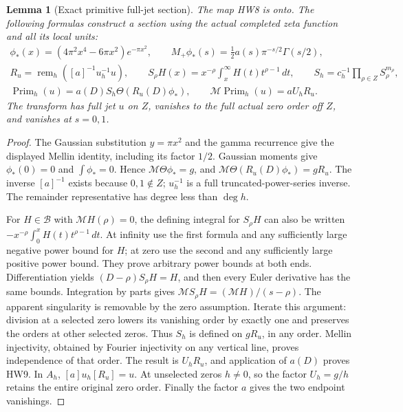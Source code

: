 \documentclass[11pt]{article}
\newtheorem{lemma}[theorem]{Lemma}
\newcommand{\B}{\mathscr B}
\newcommand{\M}{\mathcal M}
\newcommand{\rem}{\operatorname{rem}}
\begin{document}
\begin{lemma}[Exact primitive full-jet section]\label{hw:sectionlemma}
The map HW8 is onto. The following formulas construct a section
using the actual completed zeta function and all its local units:
\[
 \begin{gathered}
 \phi_*(x)=(4\pi^2x^4-6\pi x^2)e^{-\pi x^2},\qquad
 M_+\phi_*(s)=\tfrac12a(s)\pi^{-s/2}\Gamma(s/2),\\
 R_u=\rem_h([a]^{-1}u_h^{-1}u),\qquad
 S_\rho H(x)=x^{-\rho}\int_x^\infty H(t)t^{\rho-1}\,dt,\qquad
 S_h=c_h^{-1}\prod_{\rho\in Z}S_\rho^{m_\rho},\\
 \operatorname{Prim}_h(u)
       =a(D)S_h\Theta(R_u(D)\phi_*),\qquad
 \M\operatorname{Prim}_h(u)=aU_hR_u.
 \end{gathered}
 \tag{HW9}\label{hw:primitive}
\]
The transform has full jet \(u\) on \(Z\), vanishes to the full
actual zero order off \(Z\), and vanishes at \(s=0,1\).
\end{lemma}
\begin{proof}
The Gaussian substitution \(y=\pi x^2\) and the gamma recurrence
give the displayed Mellin identity, including its factor \(1/2\).
Gaussian moments give \(\phi_*(0)=0\) and \(\int\phi_*=0\).
Hence \(\M\Theta\phi_*=g\), and
\(\M\Theta(R_u(D)\phi_*)=gR_u\).
The inverse \([a]^{-1}\) exists because \(0,1\notin Z\);
\(u_h^{-1}\) is a full truncated-power-series inverse.
The remainder representative has degree less than \(\deg h\).

For \(H\in\B\) with \(\M H(\rho)=0\), the defining integral
for \(S_\rho H\) can also be written
\(-x^{-\rho}\int_0^xH(t)t^{\rho-1}\,dt\).
At infinity use the first formula and any sufficiently large
negative power bound for \(H\); at zero use the second and any
sufficiently large positive power bound. They prove arbitrary
power bounds at both ends. Differentiation yields
\((D-\rho)S_\rho H=H\), and then every Euler derivative has
the same bounds. Integration by parts gives
\(\M S_\rho H=(\M H)/(s-\rho)\).
The apparent singularity is removable by the zero assumption.
Iterate this argument: division at a selected zero lowers its
vanishing order by exactly one and preserves the orders at other
selected zeros. Thus \(S_h\) is defined on \(gR_u\), in any order.
Mellin injectivity, obtained by Fourier injectivity on any vertical
line, proves independence of that order.
The result is \(U_hR_u\), and application of \(a(D)\) proves HW9.
In \(A_h\), \([a]u_h[R_u]=u\). At unselected zeros \(h\ne0\),
so the factor \(U_h=g/h\) retains the entire original zero order.
Finally the factor \(a\) gives the two endpoint vanishings.
\end{proof}
\end{document}
